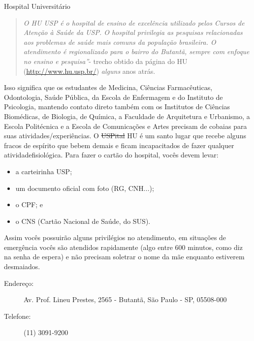 \begin{secao}{Hospital Universitário}
   \begin{quote}\emph{O HU USP é o hospital de ensino de excelência utilizado
pelos Cursos de Atenção à Saúde da USP.  O hospital privilegia as pesquisas
relacionadas aos problemas de saúde  mais comuns da população brasileira. O
atendimento é regionalizado para o bairro do Butantã, sempre com enfoque no
ensino e pesquisa''}- trecho obtido da página do HU (\url{http://www.hu.usp.br/})
\textit{alguns} anos atrás.
   \end{quote}

Isso significa que os estudantes de Medicina, Ciências Farmacêuticas,
Odontologia, Saúde Pública, da Escola de Enfermagem e do Instituto de
Psicologia, mantendo contato direto também com os Institutos de Ciências
Biomédicas, de Biologia, de Química, a Faculdade de Arquitetura e Urbanismo,
a Escola Politécnica e a Escola de Comunicações e Artes precisam de cobaias para
suas atividades/experiências. O \sout{USPital} HU é um santo lugar que recebe alguns 
fracos de espírito que bebem demais e ficam incapacitados de fazer qualquer 
atividadefisiológica. Para fazer o cartão do hospital, vocês devem levar:

\begin{itemize}
   \item a carteirinha USP;
   \item um documento oficial com foto (RG, CNH...);
   \item o CPF; e
   \item o CNS (Cartão Nacional de Saúde, do SUS).
\end{itemize}

Assim vocês possuirão alguns privilégios no atendimento, em situações de
emergência vocês são atendidos rapidamente (algo entre 600 minutos, como
diz na senha de espera) e não precisam soletrar o nome da mãe enquanto
estiverem desmaiados.

\begin{description}
\item [Endereço:] Av. Prof. Lineu Prestes, 2565 - Butantã, São Paulo - SP, 05508-000
\item [Telefone:] (11) 3091-9200
\end{description}

\end{secao}

